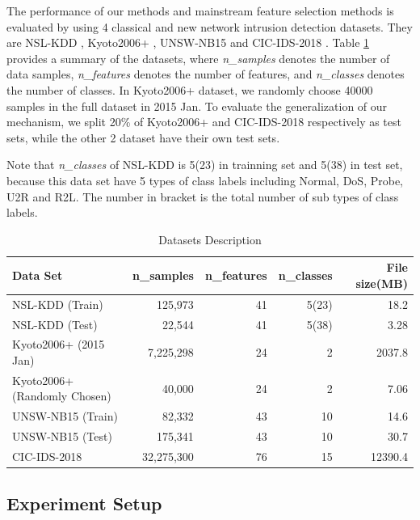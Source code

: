 \documentclass{ieeeaccess}
\theoremstyle{definition}
\begin{document}
The performance of our methods and mainstream feature selection methods is evaluated by using 4 classical and new network intrusion detection datasets. They are NSL-KDD \cite{nsl-kdd}, Kyoto2006+ \cite{kyoto2006}, UNSW-NB15 \cite{UNSWNB2015} and CIC-IDS-2018 \cite{CIC-IDS-2018}. 
Table \ref{tab:datasets} provides a summary of the datasets, where \emph{n\_samples} denotes the number of data samples, \emph{n\_features} denotes the number of features, and \emph{n\_classes} denotes the number of classes. 
In Kyoto2006+ dataset, we randomly choose 40000 samples in the full dataset in 2015 Jan. 
To evaluate the generalization of our mechanism, we split 20\% of Kyoto2006+ and CIC-IDS-2018 respectively as test sets, while the other 2 dataset have their own test sets.

Note that \emph{n\_classes} of NSL-KDD is 5(23) in trainning set and 5(38) in test set, because this data set have 5 types of class labels including Normal, DoS, Probe, U2R and R2L. The number in bracket is the total number of sub types of class labels.

\begin{table}[!htbp]
    \centering
    \caption{Datasets Description}
        \begin{tabular}{lrrrr}
        \toprule
        Data Set                    & n\_samples & n\_features & n\_classes & File size(MB) \\
        \midrule
        NSL-KDD\cite{nsl-kdd} (Train)            & 125,973    & 41    & 5(23) & 18.2      \\
        NSL-KDD (Test)                           & 22,544     & 41    & 5(38) & 3.28      \\
        Kyoto2006+\cite{kyoto2006} (2015 Jan)    & 7,225,298   & 24    & 2     & 2037.8    \\
        Kyoto2006+ (Randomly Chosen)             & 40,000     & 24    & 2     & 7.06      \\
        UNSW-NB15\cite{UNSWNB2015} (Train)       & 82,332     & 43    & 10    & 14.6      \\
        UNSW-NB15 (Test)                         & 175,341    & 43    & 10    & 30.7      \\
        CIC-IDS-2018\cite{CIC-IDS-2018}         & 32,275,300  & 76    & 15    & 12390.4   \\
        \bottomrule
        \end{tabular}%
    \label{tab:datasets}%
\end{table}%

\subsection{Experiment Setup}
\end{document}
